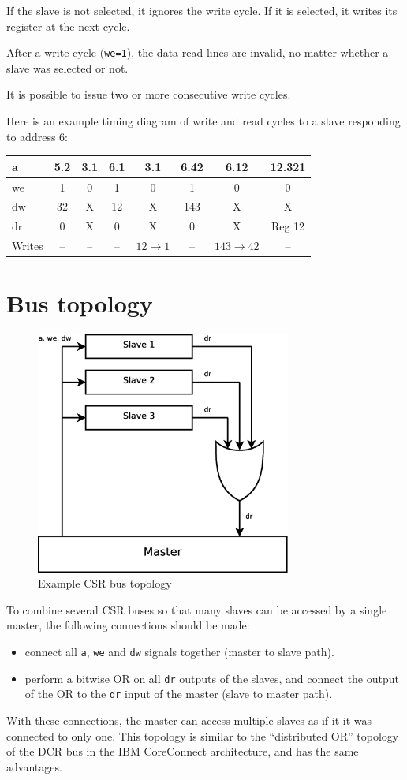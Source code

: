 \documentclass[a4paper,11pt]{article}
\begin{document}
If the slave is not selected, it ignores the write cycle. If it is selected, it writes its register at the next cycle.

After a write cycle (\verb!we=1!), the data read lines are invalid, no matter whether a slave was selected or not.

It is possible to issue two or more consecutive write cycles.

Here is an example timing diagram of write and read cycles to a slave responding to address 6:

\begin{tabular}{|l|c|c|c|c|c|c|c|}
\hline
a & 5.2 & 3.1 & 6.1 & 3.1 & 6.42 & 6.12 & 12.321 \\
\hline
we & 1 & 0 & 1 & 0 & 1 & 0 & 0 \\
\hline
dw & 32 & X & 12 & X & 143 & X & X \\
\hline
dr & 0 & X & 0 & X & 0 & X & Reg 12 \\
\hline
Writes & -- & -- & -- & $12\to1$ & -- & $143\to42$ & -- \\
\hline
\end{tabular}

\section{Bus topology}

\begin{figure}[H]
\centering
\includegraphics[height=80mm]{csr_topology.eps}
\caption{Example CSR bus topology}
\end{figure}

To combine several CSR buses so that many slaves can be accessed by a single master, the following connections should be made:
\begin{itemize}
\item connect all \verb!a!, \verb!we! and \verb!dw! signals together (master to slave path).
\item perform a bitwise OR on all \verb!dr! outputs of the slaves, and connect the output of the OR to the \verb!dr! input of the master (slave to master path).
\end{itemize}
With these connections, the master can access multiple slaves as if it it was connected to only one.
This topology is similar to the ``distributed OR'' topology of the DCR bus in the IBM CoreConnect architecture, and has the same advantages.
\end{document}
